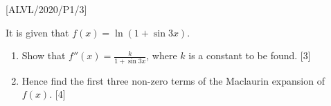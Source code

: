 \item {[}ALVL/2020/P1/3{]}

It is given that $f\left(x\right)=\ln\left(1+\sin3x\right)$. 
\begin{enumerate}
\item Show that $f''\left(x\right)=\frac{k}{1+\sin3x}$, where $k$ is a
constant to be found. \hfill{}{[}3{]}
\item Hence find the first three non-zero terms of the Maclaurin expansion
of $f\left(x\right)$.\hfill{} {[}4{]}
\end{enumerate}
